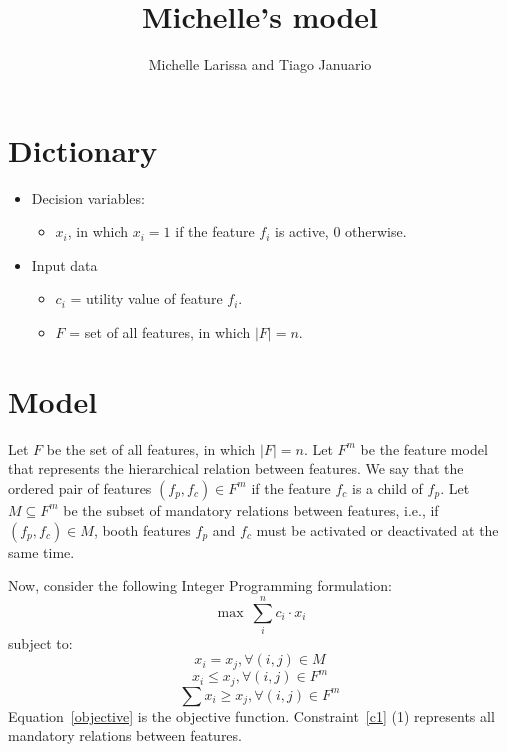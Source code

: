 \documentclass[11pt]{article} %
\title{Michelle's model}
\author{Michelle Larissa and Tiago Januario}
\begin{document}
\maketitle

\section{Dictionary}
{}
\begin{itemize}
\item Decision variables:
\begin{itemize}
\item $x_i$, in which $x_i = 1$ if the feature $f_i$ is active, 0 otherwise. 
\end{itemize}
\item Input data
\begin{itemize}
\item $c_i$ = utility value of feature $f_i$.
\item $F$ = set of all features, in which $|F| = n$.
\end{itemize}
\end{itemize}
{}
\section{Model}
Let $F$ be the set of all features, in which $|F|=n$. Let $F^m$ be the feature model that represents the hierarchical relation between features. We say that the ordered pair of features $(f_p,f_c) \in F^m$ if the feature $f_c$ is a child of $f_p$.  Let $M \subseteq F^m$ be the subset of mandatory relations between features, i.e., if $(f_p,f_c) \in M$, booth features $f_p$ and $f_c$ must be activated or deactivated at the same time.


Now, consider the following Integer Programming formulation:
\begin{equation}\label{objective}
\max~\sum_i^n{c_i\cdot x_i}
\end{equation}
subject to:
\begin{equation}\label{c1}
x_i = x_j, \forall (i,j) \in M
\end{equation}
\begin{equation}\label{c2}
x_i \leq x_j, \forall (i,j) \in F^m
\end{equation}
\begin{equation}\label{c3}
\sum x_i \geq x_j, \forall (i,j) \in F^m
\end{equation}
Equation~\ref{objective} is the objective function. Constraint~\ref{c1} (1) represents all mandatory relations between features.
\end{document}
